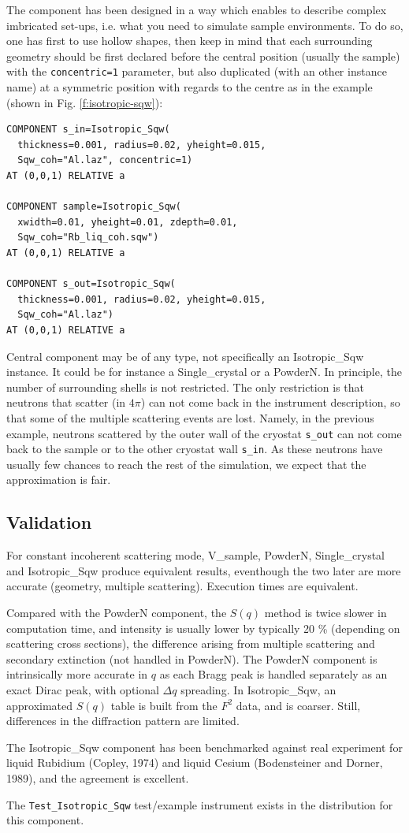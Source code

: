 The component has been designed in a way which enables to describe complex imbricated set-ups, i.e. what you need to simulate sample environments. To do so, one has first to use hollow shapes, then keep in mind that each surrounding geometry should be first declared before the central position (usually the sample) with the \verb+concentric=1+ parameter, but also duplicated (with an other instance name) at a symmetric position with regards to the centre as in the example (shown in Fig. \ref{f:isotropic-sqw}):
\begin{lstlisting}
COMPONENT s_in=Isotropic_Sqw(
  thickness=0.001, radius=0.02, yheight=0.015,
  Sqw_coh="Al.laz", concentric=1)
AT (0,0,1) RELATIVE a

COMPONENT sample=Isotropic_Sqw(
  xwidth=0.01, yheight=0.01, zdepth=0.01,
  Sqw_coh="Rb_liq_coh.sqw")
AT (0,0,1) RELATIVE a

COMPONENT s_out=Isotropic_Sqw(
  thickness=0.001, radius=0.02, yheight=0.015,
  Sqw_coh="Al.laz")
AT (0,0,1) RELATIVE a
\end{lstlisting}
Central component may be of any type, not specifically an Isotropic\_Sqw instance. It could be for instance a Single\_crystal or a PowderN.
In principle, the number of surrounding shells is not restricted.
The only restriction is that neutrons that scatter (in $4\pi$) can not come back in the instrument description, so that some of the multiple scattering events are lost. Namely, in the previous example, neutrons scattered by the outer wall of the cryostat \verb+s_out+ can not come back to the sample or to the other cryostat wall \verb+s_in+. As these neutrons have usually few chances to reach the rest of the simulation, we expect that the approximation is fair.

\subsection{Validation}
For constant incoherent scattering mode, V\_sample, PowderN, Single\_crystal and Isotropic\_Sqw produce equivalent results, eventhough the two later are more accurate (geometry, multiple scattering). Execution times are equivalent.

Compared with the PowderN component, the $S(q)$ method is twice slower in computation time, and intensity is usually lower by typically 20 \% (depending on scattering cross sections), the difference arising from multiple scattering and secondary extinction (not handled in PowderN). The PowderN component is intrinsically more accurate in $q$ as each Bragg peak is handled separately as an exact Dirac peak, with optional $\Delta q$ spreading. In Isotropic\_Sqw, an approximated $S(q)$ table is built from the $F^2$ data, and is coarser. Still, differences in the diffraction pattern are limited.

The Isotropic\_Sqw component has been benchmarked against real experiment for liquid Rubidium (Copley, 1974) and liquid Cesium (Bodensteiner  and Dorner, 1989), and the agreement is excellent.

The \verb+Test_Isotropic_Sqw+ test/example instrument exists in the distribution for this component.




